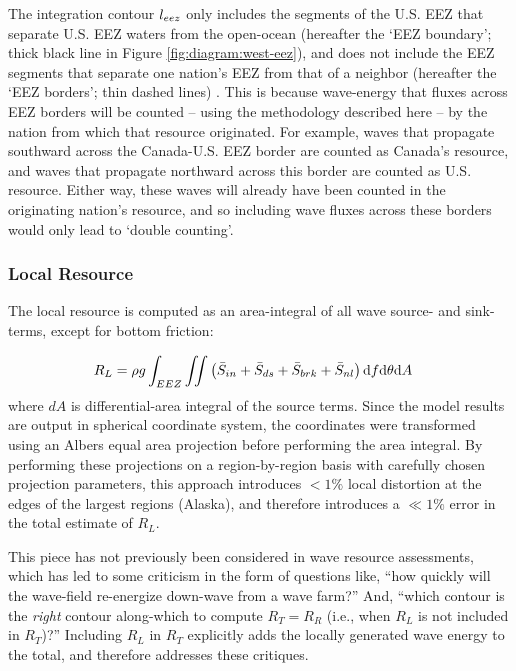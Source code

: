 The integration contour $l_{eez}$ only includes the segments of the U.S. EEZ that separate U.S. EEZ waters from the open-ocean (hereafter the `EEZ boundary'; thick black line in Figure \ref{fig:diagram:west-eez}), and does not include the EEZ segments that separate one nation's EEZ from that of a neighbor (hereafter the `EEZ borders'; thin dashed lines) \citep[]{flandersmarineinstituteMaritimeBoundariesGeodatabase2018}. This is because wave-energy that fluxes across EEZ borders will be counted -- using the methodology described here -- by the nation from which that resource originated. For example, waves that propagate southward across the Canada-U.S. EEZ border are counted as Canada's resource, and waves that propagate northward across this border are counted as U.S. resource. Either way, these waves will already have been counted in the originating nation's resource, and so including wave fluxes across these borders would only lead to `double counting'.


\subsubsection{Local Resource} \label{sec:method:calc:local}

The local resource is computed as an area-integral of all wave source- and sink-terms, except for bottom friction:

\begin{align}
  R_L &= \rho g \int_{EEZ}\iint \left ( \bar{S}_{in} + \bar{S}_{ds} + \bar{S}_{brk} + \bar{S}_{nl} \right ) \mathrm{d} f \mathrm{d} \theta \mathrm{d} A
\label{eqn:RL}
\end{align}
where $dA$ is differential-area integral of the source terms. Since the model results are output in spherical coordinate system, the coordinates were transformed using an Albers equal area projection before performing the area integral. By performing these projections on a region-by-region basis with carefully chosen projection parameters, this approach introduces $<1\% $ local distortion at the edges of the largest regions (Alaska), and therefore introduces a $\ll 1\%$ error in the total estimate of $R_L$.

This piece has not previously been considered in wave resource assessments, which has led to some criticism in the form of questions like, ``how quickly will the wave-field re-energize down-wave from a wave farm?''  And, ``which contour is the {\em right} contour along-which to compute $R_T = R_R$ (i.e., when $R_L$ is not included in $R_T$)?'' Including $R_L$ in $R_T$ explicitly adds the locally generated wave energy to the total, and therefore addresses these critiques. 

